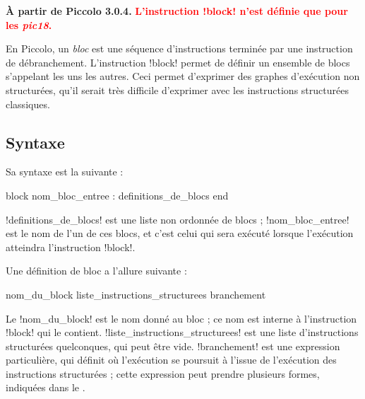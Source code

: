 
\textbf{À partir de Piccolo 3.0.4.} \textcolor{red}{\bf L'instruction \pic!block! n'est définie que pour les \emph{pic18}.}

En Piccolo, un \emph{bloc} est une séquence d'instructions terminée par une instruction de débranchement. L'instruction \pic!block! permet de définir un ensemble de blocs s'appelant les uns les autres. Ceci permet d'exprimer des graphes d'exécution non structurées, qu'il serait très difficile d'exprimer avec les instructions structurées classiques. 

\subsection{Syntaxe}

Sa syntaxe est la suivante :


\begin{piccolo}
block nom_bloc_entree :
  definitions_de_blocs
end
\end{piccolo}

\pic!definitions_de_blocs! est une liste non ordonnée de blocs ; \pic!nom_bloc_entree! est le nom de l'un de ces blocs, et c'est celui qui sera exécuté lorsque l'exécution atteindra l'instruction \pic!block!.

Une définition de bloc a l'allure suivante :

\begin{piccolo}
nom_du_block { liste_instructions_structurees } branchement
\end{piccolo}

Le \pic!nom_du_block! est le nom donné au bloc ; ce nom est interne à l'instruction \pic!block! qui le contient. \pic!liste_instructions_structurees! est une liste d'instructions structurées quelconques, qui peut être vide. \pic!branchement! est une expression particulière, qui définit où l'exécution se poursuit à l'issue de l'exécution des instructions structurées ; cette expression peut prendre plusieurs formes, indiquées dans le .

